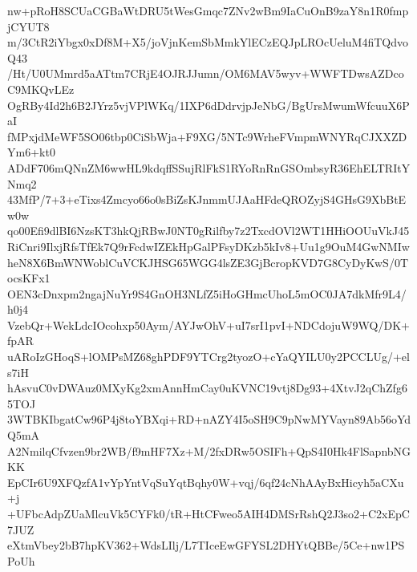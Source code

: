 nw+pRoH8SCUaCGBaWtDRU5tWesGmqc7ZNv2wBm9IaCuOnB9zaY8n1R0fmpjCYUT8
m/3CtR2iYbgx0xDf8M+X5/joVjnKemSbMmkYlECzEQJpLROcUeluM4fiTQdvoQ43
/Ht/U0UMmrd5aATtm7CRjE4OJRJJumn/OM6MAV5wyv+WWFTDwsAZDcoC9MKQvLEz
OgRBy4Id2h6B2JYrz5vjVPlWKq/1IXP6dDdrvjpJeNbG/BgUrsMwumWfcuuX6PaI
fMPxjdMeWF5SO06tbp0CiSbWja+F9XG/5NTc9WrheFVmpmWNYRqCJXXZDYm6+kt0
ADdF706mQNnZM6wwHL9kdqffSSujRlFkS1RYoRnRnGSOmbsyR36EhELTRItYNmq2
43MfP/7+3+eTixs4Zmcyo66o0sBiZsKJnmmUJAaHFdeQROZyjS4GHsG9XbBtEw0w
qo00Efi9dlBI6NzsKT3hkQjRBwJ0NT0gRilfby7z2TxcdOVl2WT1HHiOOUuVkJ45
RiCnri9IlxjRfsTfEk7Q9rFcdwIZEkHpGalPFsyDKzb5kIv8+Uu1g9OuM4GwNMIw
heN8X6BmWNWoblCuVCKJHSG65WGG4lsZE3GjBcropKVD7G8CyDyKwS/0TocsKFx1
OEN3cDnxpm2ngajNuYr9S4GnOH3NLfZ5iHoGHmcUhoL5mOC0JA7dkMfr9L4/h0j4
VzebQr+WekLdcIOcohxp50Aym/AYJwOhV+uI7srI1pvI+NDCdojuW9WQ/DK+fpAR
uARoIzGHoqS+lOMPsMZ68ghPDF9YTCrg2tyozO+cYaQYILU0y2PCCLUg/+els7iH
hAsvuC0vDWAuz0MXyKg2xmAnnHmCay0uKVNC19vtj8Dg93+4XtvJ2qChZfg65TOJ
3WTBKIbgatCw96P4j8toYBXqi+RD+nAZY4I5oSH9C9pNwMYVayn89Ab56oYdQ5mA
A2NmilqCfvzen9br2WB/f9mHF7Xz+M/2fxDRw5OSIFh+QpS4I0Hk4FlSapnbNGKK
EpCIr6U9XFQzfA1vYpYntVqSuYqtBqhy0W+vqj/6qf24cNhAAyBxHicyh5aCXu+j
+UFbcAdpZUaMlcuVk5CYFk0/tR+HtCFweo5AIH4DMSrRshQ2J3so2+C2xEpC7JUZ
eXtmVbey2bB7hpKV362+WdsLIlj/L7TIceEwGFYSL2DHYtQBBe/5Ce+nw1PSPoUh
